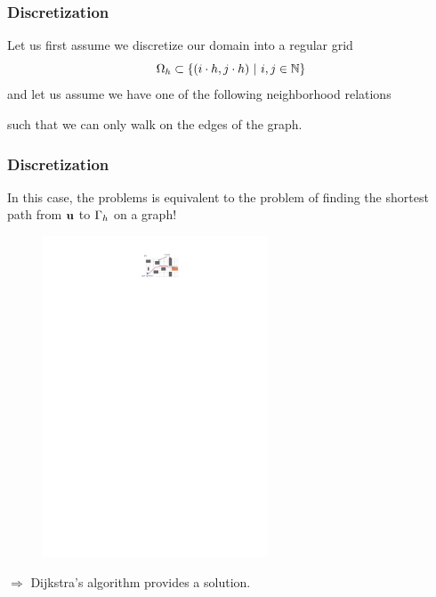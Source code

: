 \documentclass[aspectratio=169,handout]{beamer}
\begin{document}
\begin{frame}
	\frametitle{Discretization}
	Let us first assume we discretize our domain into a regular grid
	\begin{equation*}
		\Omega_{h} \subset \left\{ (i \cdot h, j \cdot h) \ | \ i, j \in \mathbb{N} \right\}
	\end{equation*}
	and let us assume we have one of the following neighborhood relations
		\begin{figure}
		\hspace{3cm}
	\end{figure}
	such that we can only walk on the edges of the graph.
\end{frame}

\begin{frame}
	\frametitle{Discretization}
	In this case, the problems is equivalent to the problem of finding the shortest path from $\mathbf{u}$ to $\Gamma_h$ on a graph!
	\begin{figure}
		\centering
		\includegraphics[width=0.6\textwidth]{./figs/wayfinding-in-Z_en.pdf}
	\end{figure}
	$\Rightarrow$ Dijkstra's \cite{dijkstra-1959} algorithm provides a solution.
\end{frame}
\end{document}
